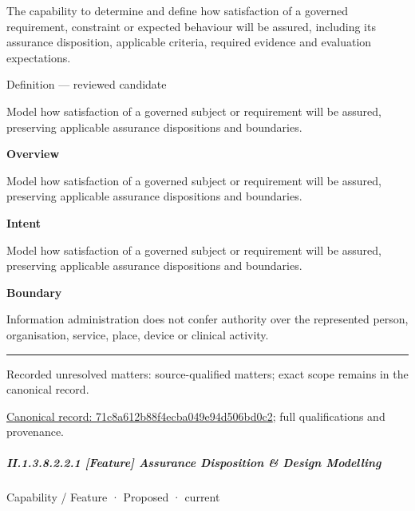 The capability to determine and define how satisfaction of a governed requirement, constraint or expected behaviour will be assured, including its assurance disposition, applicable criteria, required evidence and evaluation expectations.



Definition — reviewed candidate



Model how satisfaction of a governed subject or requirement will be assured, preserving applicable assurance dispositions and boundaries.



\textbf{Overview}



Model how satisfaction of a governed subject or requirement will be assured, preserving applicable assurance dispositions and boundaries.



\textbf{Intent}



Model how satisfaction of a governed subject or requirement will be assured, preserving applicable assurance dispositions and boundaries.



\textbf{Boundary}



Information administration does not confer authority over the represented person, organisation, service, place, device or clinical activity.



\medskip\hrule\medskip

{\small Recorded unresolved matters: source-qualified matters; exact scope remains in the canonical record.}\par
{\footnotesize \href{../../../../continuum/strategy/capability/71c8a612b88f4ecba049e94d506bd0c2.md}{Canonical record: 71c8a612b88f4ecba049e94d506bd0c2}; full qualifications and provenance.}\par
\subparagraph*{II.1.3.8.2.2.1 [Feature] Assurance Disposition \& Design Modelling}
\label{navigation:II.1.3.8.2.2.1}

\label{element:c36180ebffe44b8db587a00e78b4b358}
{\small Capability / Feature · Proposed · current}\par

